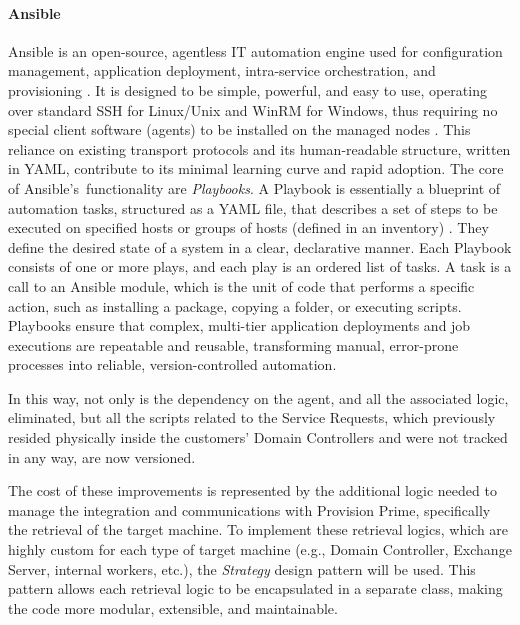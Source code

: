\paragraph{Ansible} Ansible is an open-source, agentless IT automation engine used for configuration management, application deployment, intra-service orchestration, and provisioning \cite{ansible}. It is designed to be simple, powerful, and easy to use, operating over standard SSH for Linux/Unix and WinRM for Windows, thus requiring no special client software (agents) to be installed on the managed nodes \cite{ansible}. This reliance on existing transport protocols and its human-readable structure, written in YAML, contribute to its minimal learning curve and rapid adoption. The core of Ansible's~functionality are \textit{Playbooks}. A Playbook is essentially a blueprint of automation tasks, structured as a YAML file, that describes a set of steps to be executed on specified hosts or groups of hosts (defined in an inventory) \cite{ansible}. They define the desired state of a system in a clear, declarative manner. Each Playbook consists of one or more plays, and each play is an ordered list of tasks. A task is a call to an Ansible module, which is the unit of code that performs a specific action, such as installing a package, copying a folder, or executing scripts. Playbooks ensure that complex, multi-tier application deployments and job executions are repeatable and reusable, transforming manual, error-prone processes into reliable, version-controlled automation.

In this way, not only is the dependency on the agent, and all the associated logic, eliminated, but all the scripts related to the Service Requests, which previously resided physically inside the customers' Domain Controllers and were not tracked in any way, are now versioned.

The cost of these improvements is represented by the additional logic needed to manage the integration and communications with Provision Prime, specifically the retrieval of the target machine. To implement these retrieval logics, which are highly custom for each type of target machine (e.g., Domain Controller, Exchange Server, internal workers, etc.), the \textit{Strategy} design pattern \cite{strategy_pattern} will be used. This pattern allows each retrieval logic to be encapsulated in a separate class, making the code more modular, extensible, and maintainable. %

